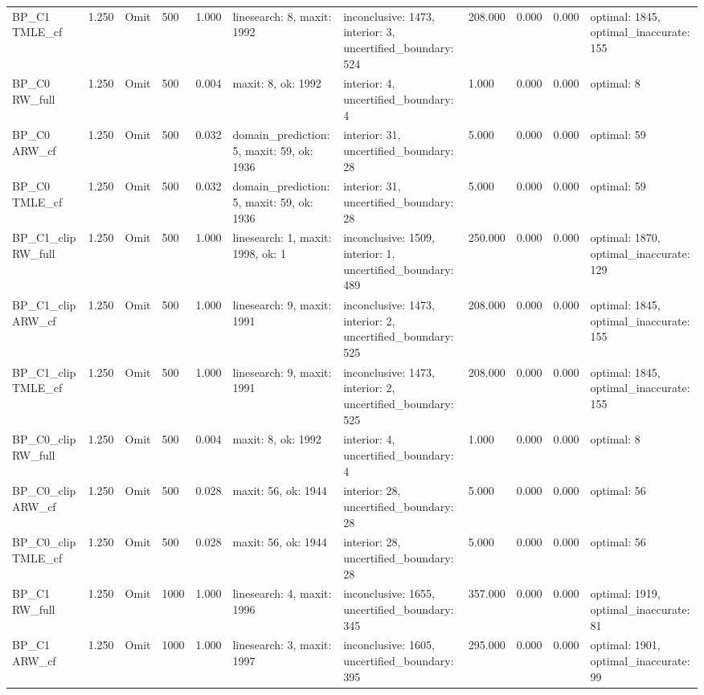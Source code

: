 \begin{tabular}{llllrlllrrl}
BP\_C1 TMLE\_cf & 1.250 & Omit & 500 & 1.000 & linesearch: 8, maxit: 1992 & inconclusive: 1473, interior: 3, uncertified\_boundary: 524 & 208.000 & 0.000 & 0.000 & optimal: 1845, optimal\_inaccurate: 155 \\
BP\_C0 RW\_full & 1.250 & Omit & 500 & 0.004 & maxit: 8, ok: 1992 & interior: 4, uncertified\_boundary: 4 & 1.000 & 0.000 & 0.000 & optimal: 8 \\
BP\_C0 ARW\_cf & 1.250 & Omit & 500 & 0.032 & domain\_prediction: 5, maxit: 59, ok: 1936 & interior: 31, uncertified\_boundary: 28 & 5.000 & 0.000 & 0.000 & optimal: 59 \\
BP\_C0 TMLE\_cf & 1.250 & Omit & 500 & 0.032 & domain\_prediction: 5, maxit: 59, ok: 1936 & interior: 31, uncertified\_boundary: 28 & 5.000 & 0.000 & 0.000 & optimal: 59 \\
BP\_C1\_clip RW\_full & 1.250 & Omit & 500 & 1.000 & linesearch: 1, maxit: 1998, ok: 1 & inconclusive: 1509, interior: 1, uncertified\_boundary: 489 & 250.000 & 0.000 & 0.000 & optimal: 1870, optimal\_inaccurate: 129 \\
BP\_C1\_clip ARW\_cf & 1.250 & Omit & 500 & 1.000 & linesearch: 9, maxit: 1991 & inconclusive: 1473, interior: 2, uncertified\_boundary: 525 & 208.000 & 0.000 & 0.000 & optimal: 1845, optimal\_inaccurate: 155 \\
BP\_C1\_clip TMLE\_cf & 1.250 & Omit & 500 & 1.000 & linesearch: 9, maxit: 1991 & inconclusive: 1473, interior: 2, uncertified\_boundary: 525 & 208.000 & 0.000 & 0.000 & optimal: 1845, optimal\_inaccurate: 155 \\
BP\_C0\_clip RW\_full & 1.250 & Omit & 500 & 0.004 & maxit: 8, ok: 1992 & interior: 4, uncertified\_boundary: 4 & 1.000 & 0.000 & 0.000 & optimal: 8 \\
BP\_C0\_clip ARW\_cf & 1.250 & Omit & 500 & 0.028 & maxit: 56, ok: 1944 & interior: 28, uncertified\_boundary: 28 & 5.000 & 0.000 & 0.000 & optimal: 56 \\
BP\_C0\_clip TMLE\_cf & 1.250 & Omit & 500 & 0.028 & maxit: 56, ok: 1944 & interior: 28, uncertified\_boundary: 28 & 5.000 & 0.000 & 0.000 & optimal: 56 \\
BP\_C1 RW\_full & 1.250 & Omit & 1000 & 1.000 & linesearch: 4, maxit: 1996 & inconclusive: 1655, uncertified\_boundary: 345 & 357.000 & 0.000 & 0.000 & optimal: 1919, optimal\_inaccurate: 81 \\
BP\_C1 ARW\_cf & 1.250 & Omit & 1000 & 1.000 & linesearch: 3, maxit: 1997 & inconclusive: 1605, uncertified\_boundary: 395 & 295.000 & 0.000 & 0.000 & optimal: 1901, optimal\_inaccurate: 99 \\

\end{tabular}
